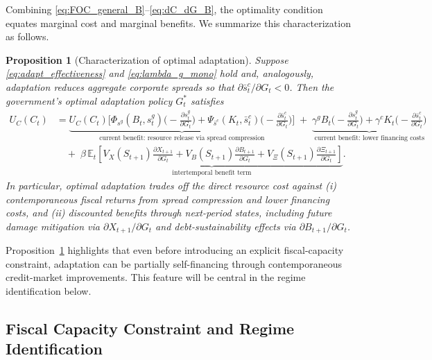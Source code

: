 \documentclass[12pt]{article}
\newtheorem{proposition}{Proposition}
\begin{document}
Combining \eqref{eq:FOC_general_B}--\eqref{eq:dC_dG_B}, the optimality condition equates marginal cost and marginal benefits.
We summarize this characterization as follows.

\begin{proposition}[Characterization of optimal adaptation]
\label{prop:optimal_G_B}
Suppose \eqref{eq:adapt_effectiveness} and \eqref{eq:lambda_g_mono} hold and, analogously, adaptation reduces aggregate
corporate spreads so that $\partial \bar s^c_t/\partial G_t<0$. Then the government's optimal adaptation policy $G_t^*$ satisfies
\begin{align}
  U_C(C_t)
  &=
  \underbrace{
    U_C(C_t)\Big[
      \Phi_{s^g}(B_t,s^g_t)\Big(-\frac{\partial s^g_t}{\partial G_t}\Big)
      +\Psi_{\bar s^c}(K_t,\bar s^c_t)\Big(-\frac{\partial \bar s^c_t}{\partial G_t}\Big)
    \Big]
  }_{\text{current benefit: resource release via spread compression}}
  \;+\;
  \underbrace{
    \gamma^g B_t\Big(-\frac{\partial s^g_t}{\partial G_t}\Big)
    +\gamma^c K_t\Big(-\frac{\partial \bar s^c_t}{\partial G_t}\Big)
  }_{\text{current benefit: lower financing costs}}
  \nonumber\\
  &\quad+\;
  \underbrace{
    \beta\,\mathbb{E}_t\!\left[
      V_X(S_{t+1})\frac{\partial X_{t+1}}{\partial G_t}
      +V_B(S_{t+1})\frac{\partial B_{t+1}}{\partial G_t}
      +V_{\Xi}(S_{t+1})\frac{\partial \Xi_{t+1}}{\partial G_t}
    \right]
  }_{\text{intertemporal benefit term}}.
  \label{eq:FOC_interpretation_B}
\end{align}
In particular, optimal adaptation trades off the direct resource cost against (i) contemporaneous fiscal returns from spread
compression and lower financing costs, and (ii) discounted benefits through next-period states, including future damage mitigation
via $\partial X_{t+1}/\partial G_t$ and debt-sustainability effects via $\partial B_{t+1}/\partial G_t$.
\end{proposition}

Proposition~\ref{prop:optimal_G_B} highlights that even before introducing an explicit fiscal-capacity constraint, adaptation can
be partially self-financing through contemporaneous credit-market improvements. This feature will be central in the regime
identification below.

\subsection{Fiscal Capacity Constraint and Regime Identification}
\label{sec:doom_identification_B}
\end{document}
